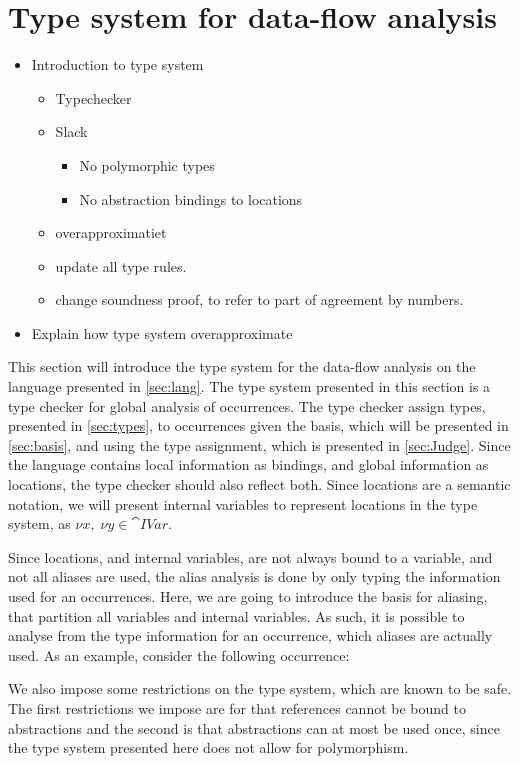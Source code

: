 \documentclass[../../master.tex]{subfiles}
\begin{document}
\section{Type system for data-flow analysis}\label{sec:TypeSys}
\begin{itemize}
	\item Introduction to type system
	\begin{itemize}
		\item Typechecker
		\item Slack
		\begin{itemize}
			\item No polymorphic types
			\item No abstraction bindings to locations
		\end{itemize}
	\item overapproximatiet
	\item update all type rules.
	\item change soundness proof, to refer to part of agreement by numbers.
	\end{itemize}
\item Explain how type system overapproximate
\end{itemize}
This section will introduce the type system for the data-flow analysis on the language presented in \cref{sec:lang}.
The type system presented in this section is a type checker for global analysis of occurrences.
The type checker assign types, presented in \cref{sec:types}, to occurrences given the basis, which will be presented in \cref{sec:basis}, and using the type assignment, which is presented in \cref{sec:Judge}.
Since the language contains local information as bindings, and global information as locations, the type checker should also reflect both.
Since locations are a semantic notation, we will present internal variables to represent locations in the type system, as $\nu x,\; \nu y\in\cat{IVar}$.

Since locations, and internal variables, are not always bound to a variable, and not all aliases are used, the alias analysis is done by only typing the information used for an occurrences.
Here, we are going to introduce the basis for aliasing, that partition all variables and internal variables.
As such, it is possible to analyse from the type information for an occurrence, which aliases are actually used.
As an example, consider the following occurrence:

We also impose some restrictions on the type system, which are known to be safe.
The first restrictions we impose are for that references cannot be bound to abstractions and the second is that abstractions can at most be used once, since the type system presented here does not allow for polymorphism.
\end{document}
